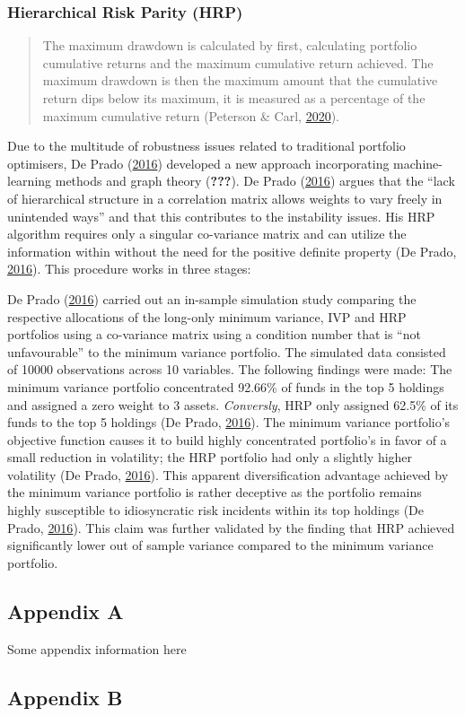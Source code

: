 \documentclass[11pt,preprint, authoryear]{elsarticle}
\numberwithin{equation}{section}
\numberwithin{figure}{section}
\numberwithin{table}{section}
\begin{document}
\hypertarget{hierarchical-risk-parity-hrp}{%
\subsubsection{Hierarchical Risk Parity
(HRP)}\label{hierarchical-risk-parity-hrp}}

\begin{quote}
The maximum drawdown is calculated by first, calculating portfolio
cumulative returns and the maximum cumulative return achieved. The
maximum drawdown is then the maximum amount that the cumulative return
dips below its maximum, it is measured as a percentage of the maximum
cumulative return (Peterson \& Carl,
\protect\hyperlink{ref-PerformanceAnalytics}{2020}).
\end{quote}

Due to the multitude of robustness issues related to traditional
portfolio optimisers, De Prado (\protect\hyperlink{ref-lopez}{2016})
developed a new approach incorporating machine-learning methods and
graph theory ({\textbf{???}}). De Prado
(\protect\hyperlink{ref-lopez}{2016}) argues that the ``lack of
hierarchical structure in a correlation matrix allows weights to vary
freely in unintended ways'' and that this contributes to the instability
issues. His HRP algorithm requires only a singular co-variance matrix
and can utilize the information within without the need for the positive
definite property (De Prado, \protect\hyperlink{ref-lopez}{2016}). This
procedure works in three stages:

De Prado (\protect\hyperlink{ref-lopez}{2016}) carried out an in-sample
simulation study comparing the respective allocations of the long-only
minimum variance, IVP and HRP portfolios using a co-variance matrix
using a condition number that is ``not unfavourable'' to the minimum
variance portfolio. The simulated data consisted of 10000 observations
across 10 variables. The following findings were made: The minimum
variance portfolio concentrated 92.66\% of funds in the top 5 holdings
and assigned a zero weight to 3 assets. \emph{Conversly}, HRP only
assigned 62.5\% of its funds to the top 5 holdings (De Prado,
\protect\hyperlink{ref-lopez}{2016}). The minimum variance portfolio's
objective function causes it to build highly concentrated portfolio's in
favor of a small reduction in volatility; the HRP portfolio had only a
slightly higher volatility (De Prado,
\protect\hyperlink{ref-lopez}{2016}). This apparent diversification
advantage achieved by the minimum variance portfolio is rather deceptive
as the portfolio remains highly susceptible to idiosyncratic risk
incidents within its top holdings (De Prado,
\protect\hyperlink{ref-lopez}{2016}). This claim was further validated
by the finding that HRP achieved significantly lower out of sample
variance compared to the minimum variance portfolio.

\hypertarget{appendix-a}{%
\subsection*{Appendix A}\label{appendix-a}}

Some appendix information here

\hypertarget{appendix-b}{%
\subsection*{Appendix B}\label{appendix-b}}


\end{document}
